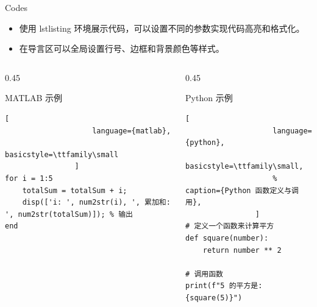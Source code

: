 \begin{frame}[fragile]{Codes}
    

    \begin{itemize}
        \item 使用 lstlisting 环境展示代码，可以设置不同的参数实现代码高亮和格式化。
        \item 在导言区可以全局设置行号、边框和背景颜色等样式。
    \end{itemize}

    \begin{columns}[T]
    
        \begin{column}{0.45\textwidth}
            \begin{exampleblock}{MATLAB 示例}
                \centering
                \begin{lstlisting}[
                    language={matlab},
                    basicstyle=\ttfamily\small
                ]
for i = 1:5 
    totalSum = totalSum + i; 
    disp(['i: ', num2str(i), ', 累加和: ', num2str(totalSum)]); % 输出
end
                \end{lstlisting}
            \end{exampleblock}
        \end{column}
        
        \begin{column}{0.45\textwidth}
            \begin{alertblock}{Python 示例}
                \centering
                \begin{lstlisting}[
                    language={python},
                    basicstyle=\ttfamily\small,
                    % caption={Python 函数定义与调用},
                ]
# 定义一个函数来计算平方
def square(number):
    return number ** 2 

# 调用函数
print(f"5 的平方是: {square(5)}")
                \end{lstlisting}
            \end{alertblock}
        \end{column}
        
    \end{columns}

\end{frame}